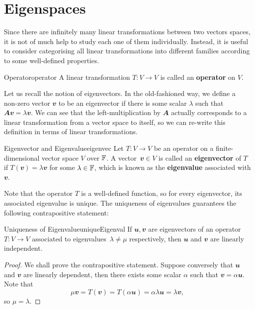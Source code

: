 \documentclass[math, code]{amznotes}
\theoremstyle{remark}
\begin{document}
\section{Eigenspaces}
Since there are infinitely many linear transformations between two vectors spaces, it is not of much help to study each one of them individually. Instead, it is useful to consider categorising all linear transformations into different families according to some well-defined properties.
\begin{dfnbox}{Operator}{operator}
    A linear transformation $T \colon V \to V$ is called an {\color{red} \textbf{operator}} on $V$.
\end{dfnbox}
Let us recall the notion of eigenvectors. In the old-fashioned way, we define a non-zero vector $\mathbfit{v}$ to be an eigenvector if there is some scalar $\lambda$ such that $\mathbfit{Av} = \lambda\mathbfit{v}$. We can see that the left-multiplication by $\mathbfit{A}$ actually corresponds to a linear transformation from a vector space to itself, so we can re-write this definition in terms of linear transformations.
\begin{dfnbox}{Eigenvector and Eigenvalue}{eigenvec}
    Let $T \colon V \to V$ be an operator on a finite-dimensional vector space $V$ over $\mathbb{F}$. A vector~$\mathbfit{v} \in V$ is called an {\color{red} \textbf{eigenvector}} of $T$ if $T(\mathbfit{v}) = \lambda\mathbfit{v}$ for some $\lambda \in \mathbb{F}$, which is known as the {\color{red} \textbf{eigenvalue}} associated with $\mathbfit{v}$.
\end{dfnbox}
Note that the operator $T$ is a well-defined function, so for every eigenvector, its associated eigenvalue is unique. The uniqueness of eigenvalues guarantees the following contrapositive statement:
\begin{probox}{Uniqueness of Eigenvalue}{uniqueEigenval}
    If $\mathbfit{u}, \mathbfit{v}$ are eigenvectors of an operator $T \colon V \to V$ associated to eigenvalues~$\lambda \neq \mu$ respectively, then $\mathbfit{u}$ and $\mathbfit{v}$ are linearly independent.
    \tcblower
    \begin{proof}
        We shall prove the contrapositive statement. Suppose conversely that $\mathbfit{u}$ and $\mathbfit{v}$ are linearly dependent, then there exists some scalar $\alpha$ such that $\mathbfit{v} = \alpha\mathbfit{u}$. Note that 
        \begin{equation*}
            \mu\mathbfit{v} = T(\mathbfit{v}) = T(\alpha\mathbfit{u}) = \alpha\lambda\mathbfit{u} = \lambda\mathbfit{v},
        \end{equation*}
        so $\mu = \lambda$.
    \end{proof}
\end{probox}
\end{document}
